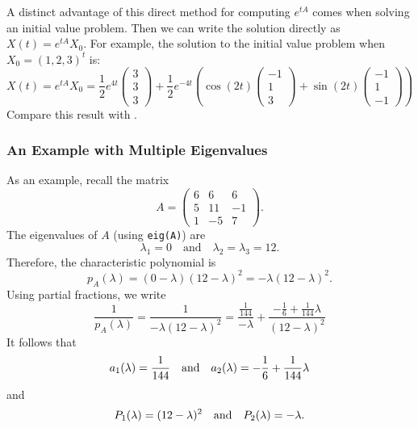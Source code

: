 A distinct advantage of this direct method for computing $e^{tA}$ comes
when solving an initial value problem.  Then we can write the solution 
directly as $X(t)=e^{tA}X_0$.  For example, the solution to the initial
value problem when $X_0=(1,2,3)^t$ is:
\[
X(t) = e^{tA}X_0 = \frac{1}{2}e^{4t}
\left(\begin{array}{c} 3\\3\\3\end{array}\right)
+ \frac{1}{2}e^{-4t}\left(\cos(2t)\left(\begin{array}{r}
-1\\1\\3\end{array}\right)+\sin(2t)
\left(\begin{array}{r} -1\\1\\-1 \end{array}\right)\right) 
\]
Compare this result with .


\subsubsection*{An Example with Multiple Eigenvalues}

As an example, recall the matrix 
\[
A =
\left(\begin{array}{rrr}
     6  &  6  &  6\\
     5  & 11  & -1\\
     1  & -5  &  7
\end{array}\right).
\]
The eigenvalues of $A$ (using {\tt eig(A)}) are
\[
\lambda_1=0\quad \mbox{and}\quad \lambda_2=\lambda_3=12.
\]
Therefore, the characteristic polynomial is
\[
p_A(\lambda) = (0-\lambda)(12-\lambda)^2=-\lambda(12-\lambda)^2.
\]
Using partial fractions, we write
\[
\frac{1}{p_A(\lambda)} = \frac{1}{-\lambda(12-\lambda)^2}=
\frac{\frac{1}{144}}{-\lambda} + 
\frac{-\frac{1}{6}+\frac{1}{144}\lambda}{(12-\lambda)^2}
\]
It follows that 
\[
a_1(\lambda)=\frac{1}{144} \quad\mbox{and}\quad a_2(\lambda) = -\frac{1}{6}+\frac{1}{144}\lambda
\]
and
\[
P_1(\lambda)=(12-\lambda)^2 \quad\mbox{and}\quad P_2(\lambda) = -\lambda.
\]

